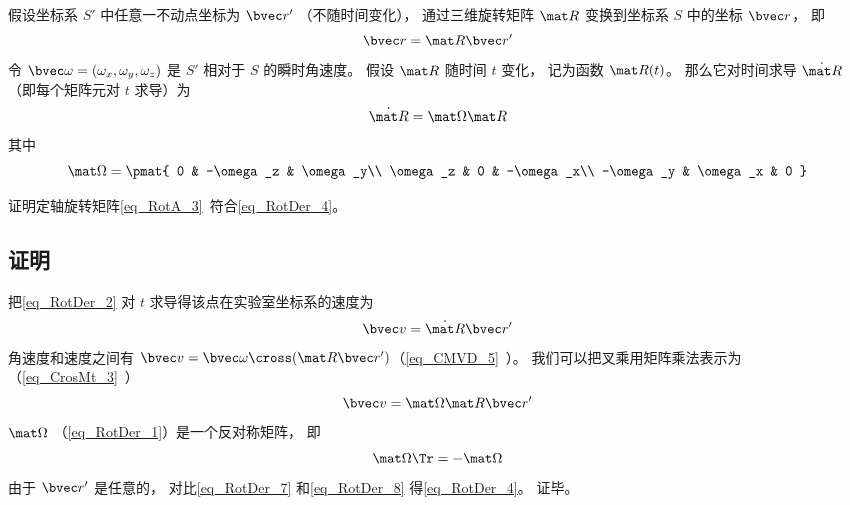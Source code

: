 

假设坐标系 $S'$ 中任意一不动点坐标为 $\bvec r'$ （不随时间变化）， 通过三维旋转矩阵 $\mat R$ 变换到坐标系 $S$ 中的坐标 $\bvec r$， 即
\begin{equation}\label{eq_RotDer_2}
\bvec r = \mat R \bvec r'
\end{equation}
令 $\bvec\omega = (\omega_x, \omega_y, \omega_z)$ 是 $S'$ 相对于 $S$ 的瞬时角速度。 假设 $\mat R$ 随时间 $t$ 变化， 记为函数 $\mat R(t)$。 那么它对时间求导 $\dot{\mat R}$ （即每个矩阵元对 $t$ 求导）为
\begin{equation}\label{eq_RotDer_4}
\dot{\mat R} = \mat \Omega \mat R
\end{equation}
其中
\begin{equation}\label{eq_RotDer_1}
\mat \Omega = \pmat{
0 & -\omega_z & \omega_y\\
\omega_z & 0 & -\omega_x\\
-\omega_y & \omega_x & 0
}
\end{equation}

\begin{exercise}{}\label{exe_RotDer_1}
证明定轴旋转矩阵\autoref{eq_RotA_3}~符合\autoref{eq_RotDer_4}。
\end{exercise}

\subsection{证明}
把\autoref{eq_RotDer_2} 对 $t$ 求导得该点在实验室坐标系的速度为
\begin{equation}\label{eq_RotDer_7}
\bvec v = \dot{\mat R} \bvec r'
\end{equation}
角速度和速度之间有 $\bvec v = \bvec \omega \cross (\mat R \bvec r')$（\autoref{eq_CMVD_5}~）。 我们可以把叉乘用矩阵乘法表示为（\autoref{eq_CrosMt_3}~）
\begin{equation}\label{eq_RotDer_8}
\bvec v = \mat\Omega \mat R \bvec r'
\end{equation}
$\mat\Omega$ （\autoref{eq_RotDer_1}）是一个反对称矩阵， 即
\begin{equation}
\mat \Omega\Tr = -\mat \Omega
\end{equation}
由于 $\bvec r'$ 是任意的， 对比\autoref{eq_RotDer_7} 和\autoref{eq_RotDer_8} 得\autoref{eq_RotDer_4}。 证毕。
